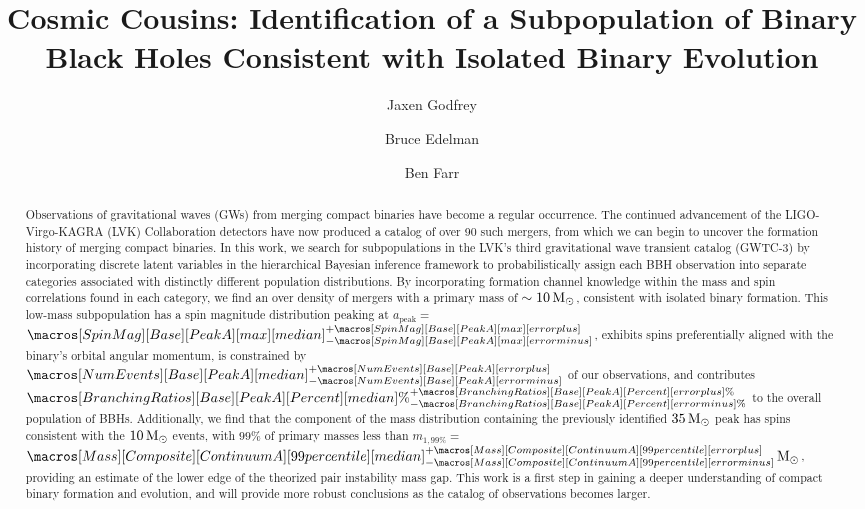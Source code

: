 \documentclass[twocolumn]{aastex631}
\newcommand{\CIPlusMinus}[1]{{#1[median]^{+#1[error plus]}_{-#1[error minus]}}}
\newcommand{\CIPlusMinusPer}[1]{{#1[median]\%^{+#1[error plus]\%}_{-#1[error minus]\%}}}
\newcommand{\msun}{\ensuremath{{\,\rm M}_\odot}}
\newcommand{\result}[1]{\textcolor{red}{#1}}
\begin{document}
\title{Cosmic Cousins: Identification of a Subpopulation of Binary Black Holes Consistent with Isolated Binary Evolution}

\author{Jaxen Godfrey}
\author{Bruce Edelman}
\author{Ben Farr}

\begin{abstract}
    Observations of gravitational waves (GWs) from merging compact binaries have become a regular occurrence. The continued advancement of the LIGO-Virgo-KAGRA (LVK) Collaboration detectors have now produced a catalog of over 90 such mergers, from which we can begin to uncover the formation history of merging compact binaries. In this work, we search for subpopulations in the LVK's third gravitational wave transient catalog (GWTC-3) by incorporating discrete latent variables in the hierarchical Bayesian inference framework to probabilistically assign each BBH observation into separate categories associated with distinctly different population distributions. By incorporating formation channel knowledge within the mass and spin correlations found in each category, we find an over density of mergers with a primary mass of $\sim10\msun$, consistent with isolated binary formation. This low-mass subpopulation has a spin magnitude distribution peaking at $a_\mathrm{peak}=$ \result{$\CIPlusMinus{\macros[SpinMag][Base][PeakA][max]}$}, exhibits spins preferentially aligned with the binary's orbital angular momentum, is constrained by \result{$\CIPlusMinus{\macros[NumEvents][Base][PeakA]}$} of our observations, and contributes \result{$\CIPlusMinusPer{\macros[BranchingRatios][Base][PeakA][Percent]}$} to the overall population of BBHs. Additionally, we find that the component of the mass distribution containing the previously identified $35\msun$ peak has spins consistent with the $10\msun$ events, with $99\%$ of primary masses less than $m_{1,99\%} = $ \result{$\CIPlusMinus{\macros[Mass][Composite][ContinuumA][99percentile]}\msun$}, providing an estimate of the lower edge of the theorized pair instability mass gap. This work is a first step in gaining a deeper understanding of compact binary formation and evolution, and will provide more robust conclusions as the catalog of observations becomes larger. 
\end{abstract}
\end{document}
